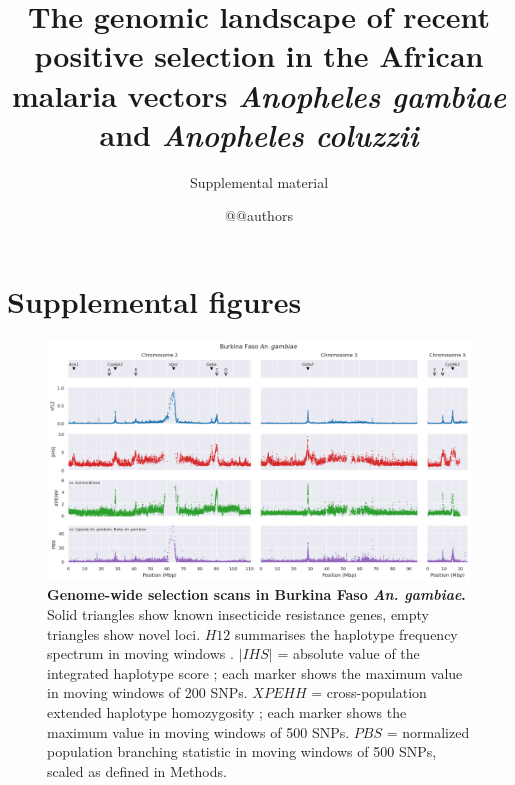 \documentclass[a4paper,11pt,abstracton,hidelinks]{scrartcl}
\title{
The genomic landscape of recent positive selection in the African malaria vectors \textit{Anopheles gambiae} and \textit{Anopheles coluzzii}
}
\subtitle{\large{Supplemental material}}
\author{@@authors}
\begin{document}
\maketitle

\beginsupplement

\tableofcontents
\listoffigures

\clearpage


\section{Supplemental figures}


\begin{landscape}

\begin{figure}[t!]
	\begin{center}
		\includegraphics*[width=1.05\linewidth,center]{artwork/gwss_bf_gam_gw_ug_gam_gq_gam.png}
	\end{center}
	\caption[Genome-wide selection scans in Burkina Faso \textit{An. gambiae}]{
	\textbf{Genome-wide selection scans in Burkina Faso \textit{An. gambiae}.} 
	Solid triangles show known insecticide resistance genes, empty triangles show novel loci. 
	$H12$ summarises the haplotype frequency spectrum in moving windows \citep{Garud2015}. 
	$|IHS|$ = absolute value of the integrated haplotype score \citep{Voight2006}; each marker shows the maximum value in moving windows of 200 SNPs.
	$XPEHH$ = cross-population extended haplotype homozygosity \citep{Sabeti2007}; each marker shows the maximum value in moving windows of 500 SNPs.
	$PBS$ = normalized population branching statistic \citep{Crawford2017} in moving windows of 500 SNPs, scaled as defined in Methods.
	} 
	\label{fig:gwss_bf_gam}
\end{figure}



\end{landscape}
\end{document}
